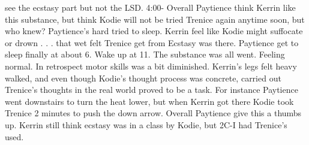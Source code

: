 \documentclass[12pt]{book}
\begin{document}
see the ecstasy part but not the LSD. 4:00- Overall Paytience think Kerrin like this substance, but think Kodie will not be tried Trenice again anytime soon, but who knew? Paytience's hard tried to sleep. Kerrin feel like Kodie might suffocate or drown . . .  that wet felt Trenice get from Ecstasy was there. Paytience get to sleep finally at about 6. Wake up at 11. The substance was all went. Feeling normal. In retrospect motor skills was a bit diminished. Kerrin's legs felt heavy walked, and even though Kodie's thought process was concrete, carried out Trenice's thoughts in the real world proved to be a task. For instance Paytience went downstairs to turn the heat lower, but when Kerrin got there Kodie took Trenice 2 minutes to push the down arrow. Overall Paytience give this a thumbs up. Kerrin still think ecstasy was in a class by Kodie, but 2C-I had Trenice's used.
\end{document}
